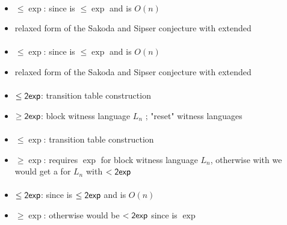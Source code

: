 \paragraph{\ONFA{}\tto\ODLA}
\begin{itemize}
	\item $\le\exp$: since \hyperref[cost:1NFAto1DFA]{\ONFA{}\tto\ODFA} is $\le\exp$ and \ODFA{}\tto\ODLA is $O(n)$
	\item relaxed form of the Sakoda and Sipser conjecture with extended \TDFA
\end{itemize}
\paragraph{\TNFA{}\tto\ODLA}
\begin{itemize}
	\item $\le\exp$: since \hyperref[cost:2NFAto1DFA]{\TNFA{}\tto\ODFA} is $\le\exp$ and \ODFA{}\tto\ODLA is $O(n)$
	\item relaxed form of the Sakoda and Sipser conjecture with extended \TDFA
\end{itemize}
\paragraph{\OLA{}\tto\ODFA}\label{cost:1LAto1DFA}
\begin{itemize}
	\item $\le\mathsf{2exp}$: transition table construction \cite{PigPis14}
	\item $\ge\mathsf{2exp}$: block witness language $L_n$ \cite{PigPis14}; "reset" witness languages \cite{PigPri+22}
\end{itemize}
\paragraph{\OLA{}\tto\ONFA}\label{cost:1LAto1NFA}
\begin{itemize}
	\item $\le\exp$: transition table construction \cite{PigPis14}
	\item $\ge\exp$: \ONFA requires $\exp$ for block witness language $L_n$, otherwise with \hyperref[cost:1NFAto1DFA]{\ONFA{}\tto\ODFA} we would get a \ODFA for $L_n$ with $<\mathsf{2exp}$ \cite{PigPis14}
\end{itemize}
\paragraph{\OLA{}\tto\TDFA}
\begin{itemize}
	\item $\le\mathsf{2exp}$: since \hyperref[cost:1LAto1DFA]{\OLA{}\tto\ODFA} is $\le\mathsf{2exp}$ and \ODFA{}\tto\TDFA is $O(n)$
	\item $\ge\exp$: otherwise \hyperref[cost:1LAto1DFA]{\OLA{}\tto\ODFA} would be $<\mathsf{2exp}$ since \hyperref[cost:2DFAto1DFA]{\TDFA{}\tto\ODFA} is $\exp$
\end{itemize}
